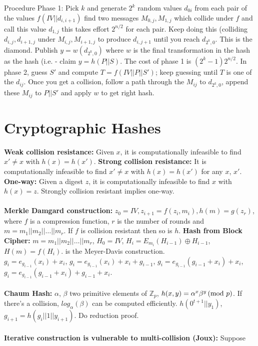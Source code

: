 Procedure Phase 1:  Pick $k$ and generate $2^k$ random values $d_{0i}$ from each pair of
the values $f(IV||d_{i, i+1})$ find two messages 
$M_{0,j}, M_{1,j}$ 
which collide under $f$ and call this value $d_{1,j}$
this takes effort $2^{n/2}$ for each pair.  Keep doing this (colliding
$d_{i,j}, d_{i+1,j}$ under $M_{i,j}, M_{i+1,j}$ to produce $d_{i, j+1}$
until you reach $d_{2^k , 0}$.  This is the diamond.  Publish $y= w(d_{2^k , 0})$
where $w$ is the final transformation in the hash as the hash (i.e. - claim $y=h(P||S)$.
The cost of phase 1 is $(2^k-1) 2^{n/2}$.  In phase 2, guess $S'$ and compute
$T= f(IV||P||S')$; keep guessing until $T$ is one of the $d_{ij}$.  Once you get a 
collision, follow a path through the $M_{ij}$ to $d_{2^k, 0}$, append these $M_{ij}$ to
$P||S'$ and apply $w$ to get right hash.
\section{Cryptographic Hashes}
{\bf Weak collision resistance:} Given $x$, it is computationally infeasible to
find $x' \ne x$ with $h(x)=h(x')$.
{\bf Strong collision resistance:} It is computationally infeasible to
find $x' \ne x$ with $h(x)=h(x')$ for any $x$, $x'$.  
{\bf One-way:} Given a
digest $z$, it is computationally infeasible to find $x$ with $h(x)=z$.
Strongly collision resistant implies one-way. \\
\\
{\bf Merkle Damgard construction:}  $z_0= IV, z_{i+1}= f(z_i, m_i), h(m)= g(z_r)$,
where $f$ is a compression function, $r$ is the number of rounds and
$m= m_1 || m_2 || \ldots || m_r$.  If $f$ is
collision resistant then so is $h$.
{\bf Hash from Block Cipher:} $m= m_1 || m_2 || \ldots || m_r$,  $H_0 = IV$, $H_i = E_{m_i}(H_{i-1}) \oplus H_{i-1}$,
$H(m)= f(H_i)$.  is the Meyer-Davis construction.\\
$g_i = e_{g_{i-1}} (x_i ) + x_i $,
$g_i = e_{g_{i-1}} (x_i ) + x_i + g_{i-1}$,
$g_i = e_{g_{i-1}} (g_{i-1} + x_i ) + x_i $,
$g_i = e_{g_{i-1}} (g_{i-1} + x_i ) + g_{i-1} + x_i $.
\\
\\
{\bf Chaum Hash:} $\alpha$,
$\beta$ two primitive elements of ${\mathbb Z}_p$,
$h(x,y)= \alpha^{x} \beta^{y} \thinspace \textnormal{(mod } p \textnormal{)}$.  If there's a collision,
$log_{\alpha} (\beta )$ can be computed efficiently. $h(0^{t+1} || y_1)$,
$g_{i+1} = h(g_i || 1 || y_{i+1})$. Do reduction proof.
\\
\\
{\bf Iterative construction is vulnerable to multi-collision (Joux):}  Suppose
